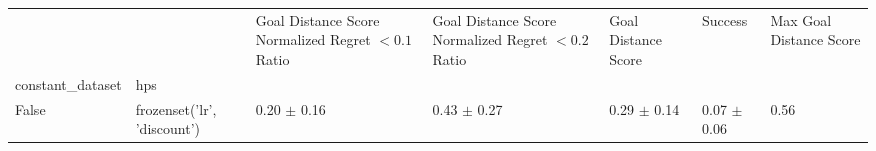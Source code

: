 \begin{tabular}{lllllll}
\toprule
 &  & Goal Distance Score Normalized Regret $< 0.1$ Ratio & Goal Distance Score Normalized Regret $< 0.2$ Ratio & Goal Distance Score & Success & Max Goal Distance Score \\
constant_dataset & hps &  &  &  &  &  \\
\midrule
False & frozenset({'lr', 'discount'}) & 0.20 $\pm$ 0.16 & 0.43 $\pm$ 0.27 & 0.29 $\pm$ 0.14 & 0.07 $\pm$ 0.06 & 0.56 \\
\cline{1-7}
\bottomrule
\end{tabular}
